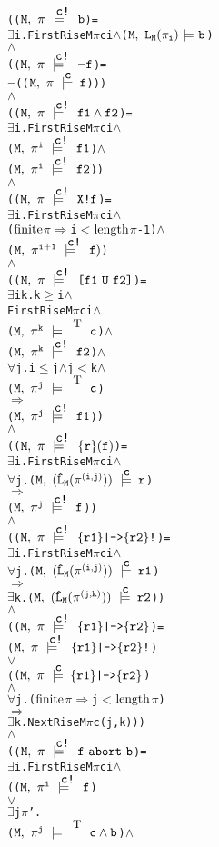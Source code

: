 \documentclass{llncs}
\newcommand{\And}{\(\wedge\)}
\newcommand{\Or}{\(\vee\)}
\newcommand{\Imp}{\(\Rightarrow\)}
\newcommand{\Not}{\(\neg\)}
\newcommand{\Forall}{\(\forall\)}
\newcommand{\Exists}{\(\exists\)}
\newcommand{\IsFinitePath}{\({\rm{finite}}\)}
\newcommand{\PathLength}{\({\rm{length}}\)}
\newcommand{\Leq}{\(\leq\)}
\newcommand{\Geq}{\(\geq\)}
\newcommand{\Le}{\(<\)}
\newcommand{\T}{\texttt{\small\rm{T}}}
\renewcommand{\Pi}{\(\pi\)}
\newcommand{\BSem}[3]{(\(\tt#1,~#2~{\models}~#3\))}
\newcommand{\SSem}[4]{(\(\tt{#1,~#2~\models^{\hspace*{-2.3mm}\raisebox{1mm}{\tt#3}}~#4}\))}
\newcommand{\FSem}[4]{(\(\tt{#1,~#2~\models^{\hspace*{-2.3mm}\raisebox{1mm}{\tt#3}}~#4}\))}
\newcommand{\FBool}[1]{#1}
\newcommand{\fNot}[1]{\neg#1}
\newcommand{\weakClock}[1]{#1}
\newcommand{\strongClock}[1]{#1!}
\newcommand{\restN}[2]{#1^{#2}}
\newcommand{\pathEl}[2]{#1_{#2}}
\newcommand{\pathSeg}[2]{#1^{#2}}
\newcommand{\lHat}[1]{\hat{\texttt{L}}_{#1}}
\newcommand{\lNoHat}[1]{{\texttt{L}}_{#1}}
\newcommand{\bAnd}[2]{#1\wedge#2}
\newcommand{\fAnd}[2]{#1 \wedge #2}
\newcommand{\fNext}[1]{\texttt{X!}#1}
\newcommand{\fUntil}[2]{\texttt{[}#1~\texttt{U}~#2\texttt{]}}
\newcommand{\fSuffixImp}[2]{\{#1\}(#2)}
\newcommand{\fStrongImp}[2]{\{#1\}\texttt{|->}\{#2\}\texttt{!}}
\newcommand{\fWeakImp}[2]{\{#1\}\texttt{|->}\{#2\}}
\newcommand{\fAbort}[2]{#1~\texttt{abort}~#2}
\begin{document}
{\begin{alltt}
    ({\FSem{M}{{\pi}}{{\strongClock{c}}}{\FBool{b}}} = 
      {\Exists}i. FirstRise M {\Pi} c i {\And} {\BSem{M}{\lNoHat{M}(\pathEl{{\pi}}{i})}{b}}
    {\And}
    ({\FSem{M}{{\pi}}{{\strongClock{c}}}{\fNot{f}}} = 
      {\Not}({\FSem{M}{{\pi}}{{\weakClock{c}}}{f}})) 
    {\And}
    ({\FSem{M}{{\pi}}{{\strongClock{c}}}{\fAnd{f1}{f2}}} = 
      {\Exists}i. FirstRise M {\Pi} c i {\And} 
          {\FSem{M}{\restN{{\pi}}{i}}{{\strongClock{c}}}{f1}}    {\And}
          {\FSem{M}{\restN{{\pi}}{i}}{{\strongClock{c}}}{f2}})
    {\And}
    ({\FSem{M}{{\pi}}{{\strongClock{c}}}{\fNext{f}}} = 
      {\Exists}i. FirstRise M {\Pi} c i            {\And} 
          ({\IsFinitePath} {\Pi} {\Imp} i {\Le} \PathLength {\Pi} - 1) {\And}
          {\FSem{M}{\restN{{\pi}}{i+1}}{{\strongClock{c}}}{f)}}
    {\And}
    ({\FSem{M}{{\pi}}{{\strongClock{c}}}{\fUntil{f1}{f2}}} = 
      {\Exists}i k. k {\Geq} i             {\And}
            FirstRise M {\Pi} c i  {\And}
            {\FSem{M}{\restN{{\pi}}{k}}{\weakClock{\T}}{{\FBool{c}}}}      {\And}  
            {\FSem{M}{\restN{{\pi}}{k}}{{\strongClock{c}}}{f2}}     {\And}
            {\Forall}j. i {\Leq} j {\And} j {\Le} k {\And} 
              {\FSem{M}{\restN{{\pi}}{j}}{\weakClock{\T}}{{\FBool{c}}}} 
              {\Imp}
              {\FSem{M}{\restN{{\pi}}{j}}{{\strongClock{c}}}{f1}})
    {\And}
    ({\FSem{M}{{\pi}}{{\strongClock{c}}}{\fSuffixImp{r}{f}}} = 
      {\Exists}i. FirstRise M {\Pi} c i {\And} 
          {\Forall}j. \SSem{M}{(\lHat{M} (\pathSeg{\pi}{(i,j)}))}{c}{r}
              {\Imp}
              {\FSem{M}{\restN{{\pi}}{j}}{{\strongClock{c}}}{f}})
    {\And}
    ({\FSem{M}{{\pi}}{{\strongClock{c}}}{\fStrongImp{r1}{r2}}} = 
      {\Exists}i. FirstRise M {\Pi} c i {\And} 
          {\Forall}j. \SSem{M}{(\lHat{M} (\pathSeg{\pi}{(i,j)}))}{c}{r1}
              {\Imp}
              {\Exists}k. \SSem{M}{(\lHat{M} (\pathSeg{\pi}{(j,k)}))}{c}{r2})
    {\And}
    ({\FSem{M}{{\pi}}{{\strongClock{c}}}{\fWeakImp{r1}{r2}}} = 
     {\FSem{M}{{\pi}}{{\strongClock{c}}}{\fStrongImp{r1}{r2}}}
      {\Or}
     ({\FSem{M}{{\pi}}{{\weakClock{c}}}{\fWeakImp{r1}{r2}}}
      {\And}
      {\Forall}j. ({\IsFinitePath} {\Pi} {\Imp} j {\Le} \PathLength {\Pi})
          {\Imp}
          {\Exists}k. NextRise M {\Pi} c (j,k)))
    {\And}
    ({\FSem{M}{{\pi}}{{\strongClock{c}}}{\fAbort{f}{b}}} =
      {\Exists}i. FirstRise M {\Pi} c i {\And}
          ({\FSem{M}{\restN{{\pi}}{i}}{{\strongClock{c}}}{f }}
           {\Or}
           {\Exists}j {\Pi}'. 
             {\FSem{M}{\restN{{\pi}}{j}}{\weakClock{\T}}{{\FBool{\bAnd{c}{b}}}}} {\And} 

\end{alltt}}
\end{document}
